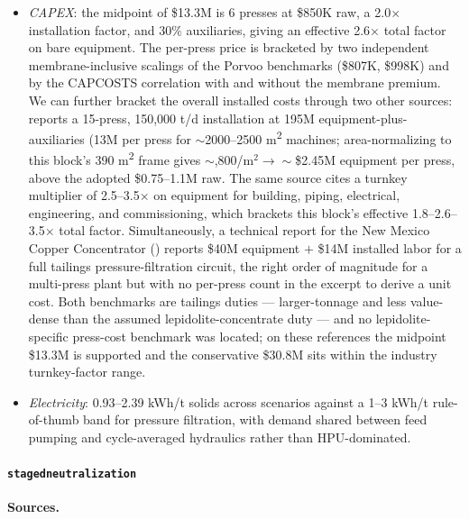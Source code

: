 \documentclass{article}
\renewcommand\_{\textunderscore\allowbreak}
\begin{document}
\begin{itemize}[noitemsep]
	\item \textit{CAPEX}: the midpoint of \$13.3M is 6 presses at \$850K raw, a 2.0$\times$ installation factor, and 30\% auxiliaries, giving an effective 2.6$\times$ total factor on bare equipment. The per-press price is bracketed by two independent membrane-inclusive scalings of the Porvoo benchmarks (\$807K, \$998K) and by the CAPCOSTS correlation with and without the membrane premium. We can further bracket the overall installed costs through two other sources: \citet{hahnWhitepaper_Tailings2024} reports a 15-press, 150,000 t/d installation at \texteuro 195M equipment-plus-auxiliaries (\texteuro 13M per press for $\sim$2000--2500 \si{m^2} machines; area-normalizing to this block's 390 \si{m^2} frame gives $\sim$,800/m$^2 \rightarrow \sim$\$2.45M equipment per press, above the adopted \$0.75--1.1M raw. The same source cites a turnkey multiplier of 2.5--3.5$\times$ on equipment for building, piping, electrical, engineering, and commissioning, which brackets this block's effective 1.8--2.6--3.5$\times$ total factor. Simultaneously, a technical report for the New Mexico Copper Concentrator (\citep{wspusaincCakeStackFiltered2025}) reports \$40M equipment $+$ \$14M installed labor for a full tailings pressure-filtration circuit, the right order of magnitude for a multi-press plant but with no per-press count in the excerpt to derive a unit cost. Both benchmarks are tailings duties --- larger-tonnage and less value-dense than the assumed lepidolite-concentrate duty --- and no lepidolite-specific press-cost benchmark was located; on these references the midpoint \$13.3M is supported and the conservative \$30.8M sits within the industry turnkey-factor range.
	\item \textit{Electricity}: 0.93--2.39 kWh/t solids across scenarios against a 1--3 kWh/t rule-of-thumb band for pressure filtration, with demand shared between feed pumping and cycle-averaged hydraulics rather than HPU-dominated.
\end{itemize}

\clearpage
\paragraph{\texttt{staged\_neutralization}}\label{app:04-methods-blockdefs-neutralization}\leavevmode\par

\medskip
\noindent\textbf{Sources.}\quad
\end{document}
